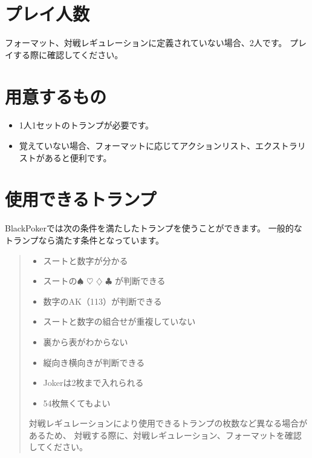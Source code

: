 \documentclass[letterpaper,10pt,dvipdfmx]{sphinxmanual}
\begin{document}
\section{プレイ人数}
\label{\detokenize{common/common:id2}}
\sphinxAtStartPar
フォーマット、対戦レギュレーションに定義されていない場合、2人です。
プレイする際に確認してください。


\section{用意するもの}
\label{\detokenize{common/common:id3}}\begin{itemize}
\item {} 
\sphinxAtStartPar
1人1セットのトランプが必要です。

\item {} 
\sphinxAtStartPar
覚えていない場合、フォーマットに応じてアクションリスト、エクストラリストがあると便利です。

\end{itemize}


\section{使用できるトランプ}
\label{\detokenize{common/common:id4}}
\sphinxAtStartPar
BlackPokerでは次の条件を満たしたトランプを使うことができます。
一般的なトランプなら満たす条件となっています。
\begin{quote}
\begin{itemize}
\item {} 
\sphinxAtStartPar
スートと数字が分かる

\item {} 
\sphinxAtStartPar
スートの{\normalsize $\spadesuit$} {\normalsize $\heartsuit$} {\normalsize $\diamondsuit$} {\normalsize $\clubsuit$} が判断できる

\item {} 
\sphinxAtStartPar
数字のA\sphinxhyphen{}K（1\sphinxhyphen{}13）が判断できる

\item {} 
\sphinxAtStartPar
スートと数字の組合せが重複していない

\item {} 
\sphinxAtStartPar
裏から表がわからない

\item {} 
\sphinxAtStartPar
縦向き横向きが判断できる

\item {} 
\sphinxAtStartPar
Jokerは2枚まで入れられる

\item {} 
\sphinxAtStartPar
54枚無くてもよい

\end{itemize}

\sphinxAtStartPar
対戦レギュレーションにより使用できるトランプの枚数など異なる場合があるため、
対戦する際に、対戦レギュレーション、フォーマットを確認してください。
\end{quote}
\end{document}
